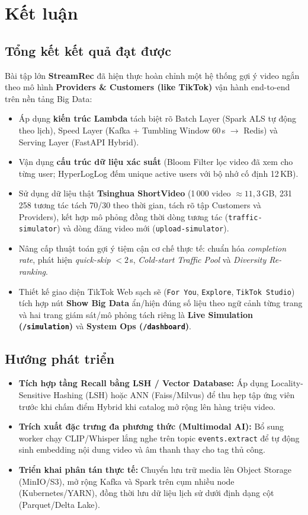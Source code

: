 \chapter{Kết luận}

\section{Tổng kết kết quả đạt được}

Bài tập lớn \textbf{StreamRec} đã hiện thực hoàn chỉnh một hệ thống gợi ý video ngắn theo mô hình \textbf{Providers \& Customers (like TikTok)} vận hành end-to-end trên nền tảng Big Data:

\begin{itemize}
  \item Áp dụng \textbf{kiến trúc Lambda} tách biệt rõ Batch Layer (Spark ALS tự động theo lịch), Speed Layer (Kafka + Tumbling Window 60\,s $\rightarrow$ Redis) và Serving Layer (FastAPI Hybrid).
  \item Vận dụng \textbf{cấu trúc dữ liệu xác suất} (Bloom Filter lọc video đã xem cho từng user; HyperLogLog đếm unique active users với bộ nhớ cố định 12\,KB).
  \item Sử dụng dữ liệu thật \textbf{Tsinghua ShortVideo} (1\,000 video $\approx 11{,}3$\,GB, 231\,258 tương tác tách 70/30 theo thời gian, tách rõ tập Customers và Providers), kết hợp mô phỏng đồng thời dòng tương tác (\texttt{traffic-simulator}) và dòng đăng video mới (\texttt{upload-simulator}).
  \item Nâng cấp thuật toán gợi ý tiệm cận cơ chế thực tế: chuẩn hóa \textit{completion rate}, phát hiện \textit{quick-skip} $<2$\,s, \textit{Cold-start Traffic Pool} và \textit{Diversity Re-ranking}.
  \item Thiết kế giao diện TikTok Web sạch sẽ (\texttt{For You}, \texttt{Explore}, \texttt{TikTok Studio}) tích hợp nút \textbf{Show Big Data} ẩn/hiện đúng số liệu theo ngữ cảnh từng trang và hai trang giám sát\slash mô phỏng tách riêng là \textbf{Live Simulation (\texttt{/simulation})} và \textbf{System Ops (\texttt{/dashboard})}.
\end{itemize}

\section{Hướng phát triển}

\begin{itemize}
  \item \textbf{Tích hợp tầng Recall bằng LSH / Vector Database:} Áp dụng Locality-Sensitive Hashing (LSH) hoặc ANN (Faiss/Milvus) để thu hẹp tập ứng viên trước khi chấm điểm Hybrid khi catalog mở rộng lên hàng triệu video.
  \item \textbf{Trích xuất đặc trưng đa phương thức (Multimodal AI):} Bổ sung worker chạy CLIP\slash Whisper lắng nghe trên topic \texttt{events.extract} để tự động sinh embedding nội dung video và âm thanh thay cho tag thủ công.
  \item \textbf{Triển khai phân tán thực tế:} Chuyển lưu trữ media lên Object Storage (MinIO/S3), mở rộng Kafka và Spark trên cụm nhiều node (Kubernetes/YARN), đồng thời lưu dữ liệu lịch sử dưới định dạng cột (Parquet/Delta Lake).
\end{itemize}
